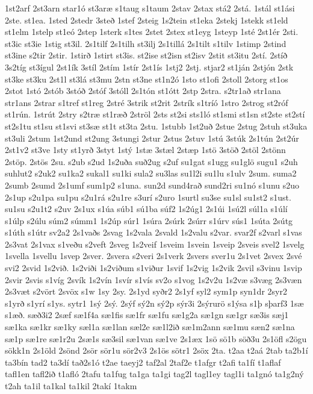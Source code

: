 {1st2arf
2st3arn
star1ó
st3aræ
s1taug
s1taum
2stav
2stax
stá2
2stá.
1stál
st1ási
2ste.
st1ea.
1sted
2stedr
3steð
1stef
2steig
1s2tein
st1eka
2stekj
1stekk
st1eld
st1elm
1stelp
st1eó
2step
1sterk
s1tes
2stet
2stex
st1eyg
1steyp
1sté
2st1ér
2sti.
st3ic
st3ie
1stig
st3il.
2s1tilf
2s1tilh
st3ilj
2s1tillá
2s1tilt
s1tilv
1stimp
2stind
st3ine
s2tir
2stir.
1stirð
1stirt
st3is.
st2ise
st2isn
st2isv
2stit
st3itu
2stí.
2stíð
3s2tíg
st3ígul
2st1ík
3stíl
2stím
1stír
2st1ís
1stj2
2stj.
stjar2
st1ján
2stjón
2stk
st3ke
st3ku
2st1l
st3lá
st3mu
2stn
st3ne
st1n2ó
1sto
st1ofi
2stoll
2storg
st1os
2stot
1stó
2stób
3stóð
2stóf
3stóll
2s1tón
st1ótt
2stp
2stra.
s2tr1að
str1ana
str1ans
2strar
s1tref
st1reg
2stré
3strik
st2rit
2strík
s1tríó
1stro
2strog
st2róf
st1rún.
1strút
2stry
s2træ
st1ræð
2ströl
2sts
st2si
sts1ló
st1smi
st1sn
st2ste
st2stí
st2s1tu
st1su
st1svi
st3sæ
st1t
st3ta
2stu.
1stubb
1st2uð
2stue
2stug
2stuh
st3uka
st3uli
2stum
1st2und
st2ung
3stungi
2stur
2stus
2stuv
1stú
3stúk
2s1tún
2st2úr
2st1v2
st3ve
1sty
st1yrð
3styt
1stý
1stæ
3stæl
2stæp
1stö
3stöð
2stöl
2stönn
2stöp.
2stös
2su.
s2ub
s2ud
1s2uða
suð2ug
s2uf
su1gat
s1ugg
su1glö
sugu1
s2uh
suhlut2
s2uk2
su1ka2
sukal1
su1ki
sula2
su3las
su1l2i
su1lu
s1ulv
2sum.
suma2
2sumb
2sumd
2s1umf
sum1p2
s1una.
sun2d
sund4rað
sund2ri
su1nó
s1unu
s2uo
2s1up
s2u1pa
su1pu
s2u1rá
s2u1re
s3urí
s2uro
1surtl
su3se
su1sl
su1st2
s1ust.
su1su
s2u1t2
s2uv
2s1ux
s1úa
súb1
sú1ba
súf2
1s2úg1
2s1úi
1sú2l
súl1a
s1úlí
s1úlp
s2úlu
súm2
súmm1
1s2úp
súr1
1súra
2súrk
2súrr
s1úrv
sús1
1súta
2sútg
s1úth
s1útr
sv2a2
2s1vaðs
2svag
1s2vala
2svald
1s2valu
s2var.
svar2f
s2varl
s1vas
2s3vat
2s1vax
s1veðu
s2veft
2sveg
1s2veif
1sveim
1svein
1sveip
2sveis
svel2
1svelg
1svella
1svellu
1svep
2sver.
2svera
s2veri
2s1verk
2svers
sver1u
2s1vet
2svex
2své
svi2
2svid
1s2við.
1s2viði
1s2viðum
s1viður
1svif
1s2vig
1s2vik
2svil
s3vinu
1svip
2svir
2svis
s1víg
2svík
1s2vín
1svír
s1vís
sv2o
s1vog
1s2v2u
1s2væ
s3væg
2s3væn
2s3væt
s2vört
2svöx
s1w
1sy
2sy.
2s1yd
syðr2
2s1yf
syl2
sym1p
syn1dr
2syr2
s1yrð
s1yrí
s1ys.
sytr1
1sý
2sý.
2sýf
sý2n
sý2p
sýr3i
2sýrurö
s1ýsa
s1þ
sþarf3
1sæ
s1æð.
sæð3i2
2sæf
sæ1f4a
sæ1fis
sæ1fr
sæ1fu
sæ1g2a
sæ1gn
sæ1gr
sæ3is
sæj1
sæ1ka
sæ1kr
sæ1ky
sæl1a
sæ1lan
sæl2e
sæ1l2ið
sæ1m2ann
sæ1mu
sæn2
sæ1na
sæ1p
sæ1re
sæ1r2u
2sæ1s
sæ3sil
sæ1van
sæ1ve
2s1æx
1sö
sö1b
söð3u
2s1öfl
s2ögu
sökk1n
2s1öld
2sönd
2sör
sör1u
sör2v3
2s1ös
sötr1
2söx
2ta.
t2aa
t2aá
2tab
ta2b1í
ta3bín
tad2
ta3dí
tað2s1ó
t2ae
taeyj2
taf2al
2taf2e
t1afgr
t2afi
ta1fí
t1aflaf
tafl1en
tafl2ið
t1afló
2tafu
ta1fug
ta1ga
ta1gi
tag2l
tagl1ey
tagl1i
ta1gnó
ta1g2ný
t2ah
ta1il
ta1kal
ta1kil
2takí
1takm
}
